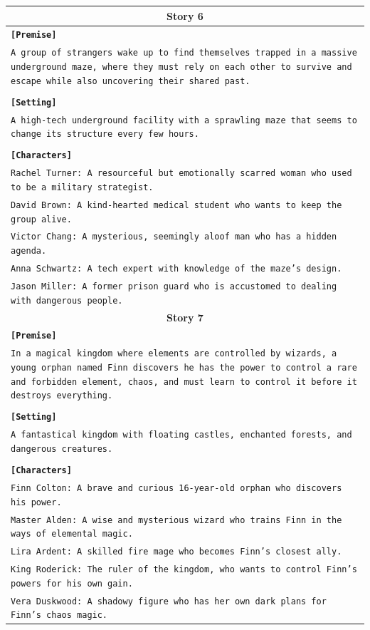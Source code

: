 \documentclass[letterpaper]{article} %
\begin{document}
\begin{small}
\begin{longtable}{p{\textwidth}}
    \multicolumn{1}{c}{\textbf{Story 6}} \\
    \midrule
    \texttt{\textbf{[Premise]}} \\
    \texttt{A group of strangers wake up to find themselves trapped in a massive underground maze, where they must rely on each other to survive and escape while also uncovering their shared past.} \\\\
    \texttt{\textbf{[Setting]}} \\
    \texttt{A high-tech underground facility with a sprawling maze that seems to change its structure every few hours.} \\\\
    \texttt{\textbf{[Characters]}} \\
    \texttt{Rachel Turner: A resourceful but emotionally scarred woman who used to be a military strategist.} \\
    \texttt{David Brown: A kind-hearted medical student who wants to keep the group alive.} \\
    \texttt{Victor Chang: A mysterious, seemingly aloof man who has a hidden agenda.} \\
    \texttt{Anna Schwartz: A tech expert with knowledge of the maze's design.} \\
    \texttt{Jason Miller: A former prison guard who is accustomed to dealing with dangerous people.} \\
    \midrule
  
    \multicolumn{1}{c}{\textbf{Story 7}} \\
    \midrule
    \texttt{\textbf{[Premise]}} \\
    \texttt{In a magical kingdom where elements are controlled by wizards, a young orphan named Finn discovers he has the power to control a rare and forbidden element, chaos, and must learn to control it before it destroys everything.} \\\\
    \texttt{\textbf{[Setting]}} \\
    \texttt{A fantastical kingdom with floating castles, enchanted forests, and dangerous creatures.} \\\\
    \texttt{\textbf{[Characters]}} \\
    \texttt{Finn Colton: A brave and curious 16-year-old orphan who discovers his power.} \\
    \texttt{Master Alden: A wise and mysterious wizard who trains Finn in the ways of elemental magic.} \\
    \texttt{Lira Ardent: A skilled fire mage who becomes Finn's closest ally.} \\
    \texttt{King Roderick: The ruler of the kingdom, who wants to control Finn's powers for his own gain.} \\
    \texttt{Vera Duskwood: A shadowy figure who has her own dark plans for Finn's chaos magic.} \\
    \midrule
  

\end{longtable}
\end{small}
\end{document}

